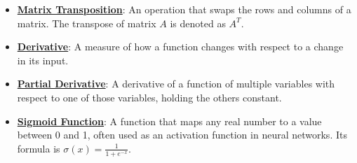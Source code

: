 \documentclass{article}%
\begin{document}
\begin{itemize}[leftmargin=*]
\item \href{https://purdue.brightspace.com/d2l/common/assets/pdfjs-d2l-dist/1.0.14-legacy/web/viewer.html?file=%2Fcontent%2Fenforced%2F1095467-wl.202510.CS.24300.001%2F04L1-Linear Algebra Primer.pdf%3Fou%3D1095467&lang=en-us&container=d2l-fileviewer-rendered-pdf&fullscreen=d2l-fileviewer-rendered-pdf-dialog&height=667#page=16}{\textbf{Matrix Transposition}}: An operation that swaps the rows and columns of a matrix. The transpose of matrix $A$ is denoted as $A^T$.%
\item \href{https://purdue.brightspace.com/d2l/common/assets/pdfjs-d2l-dist/1.0.14-legacy/web/viewer.html?file=%2Fcontent%2Fenforced%2F1095467-wl.202510.CS.24300.001%2F04L1-Linear Algebra Primer.pdf%3Fou%3D1095467&lang=en-us&container=d2l-fileviewer-rendered-pdf&fullscreen=d2l-fileviewer-rendered-pdf-dialog&height=667#page=21}{\textbf{Derivative}}: A measure of how a function changes with respect to a change in its input.%
\item \href{https://purdue.brightspace.com/d2l/common/assets/pdfjs-d2l-dist/1.0.14-legacy/web/viewer.html?file=%2Fcontent%2Fenforced%2F1095467-wl.202510.CS.24300.001%2F04L1-Linear Algebra Primer.pdf%3Fou%3D1095467&lang=en-us&container=d2l-fileviewer-rendered-pdf&fullscreen=d2l-fileviewer-rendered-pdf-dialog&height=667#page=19}{\textbf{Partial Derivative}}: A derivative of a function of multiple variables with respect to one of those variables, holding the others constant.%
\item \href{https://purdue.brightspace.com/d2l/common/assets/pdfjs-d2l-dist/1.0.14-legacy/web/viewer.html?file=%2Fcontent%2Fenforced%2F1095467-wl.202510.CS.24300.001%2F04L1-Linear Algebra Primer.pdf%3Fou%3D1095467&lang=en-us&container=d2l-fileviewer-rendered-pdf&fullscreen=d2l-fileviewer-rendered-pdf-dialog&height=667#page=21}{\textbf{Sigmoid Function}}: A function that maps any real number to a value between 0 and 1, often used as an activation function in neural networks. Its formula is $\sigma(x) = \frac{1}{1 + e^{-x}}$.%
\end{itemize}%
\end{document}
